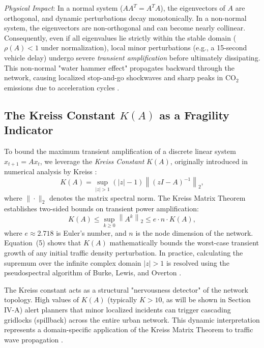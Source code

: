 \documentclass[lettersize,journal]{IEEEtran}
\begin{document}
\textit{Physical Impact}: In a normal system ($A A^T = A^T A$), the eigenvectors of $A$ are orthogonal, and dynamic perturbations decay monotonically. In a non-normal system, the eigenvectors are non-orthogonal and can become nearly collinear. Consequently, even if all eigenvalues lie strictly within the stable domain ($\rho(A) < 1$ under normalization), local minor perturbations (e.g., a 15-second vehicle delay) undergo severe \emph{transient amplification} before ultimately dissipating. This non-normal "water hammer effect" propagates backward through the network, causing localized stop-and-go shockwaves and sharp peaks in $\text{CO}_2$ emissions due to acceleration cycles \cite{Trefethen2005, Whitham2011, Kerner2009}.

\subsection{The Kreiss Constant $K(A)$ as a Fragility Indicator}
To bound the maximum transient amplification of a discrete linear system $x_{t+1} = A x_t$, we leverage the \emph{Kreiss Constant} $K(A)$, originally introduced in numerical analysis by Kreiss \cite{Kreiss1962}:
\begin{equation}
K(A) = \sup_{|z| > 1} (|z| - 1) \left\| (zI - A)^{-1} \right\|_2,
\end{equation}
where $\|\cdot\|_2$ denotes the matrix spectral norm. The Kreiss Matrix Theorem establishes two-sided bounds on transient power amplification:
\begin{equation}
K(A) \le \sup_{k \ge 0} \left\| A^k \right\|_2 \le e \cdot n \cdot K(A),
\end{equation}
where $e \approx 2.718$ is Euler's number, and $n$ is the node dimension of the network. Equation~(5) shows that $K(A)$ mathematically bounds the worst-case transient growth of any initial traffic density perturbation. In practice, calculating the supremum over the infinite complex domain $|z| > 1$ is resolved using the pseudospectral algorithm of Burke, Lewis, and Overton \cite{Burke2003}.

The Kreiss constant acts as a structural "nervousness detector" of the network topology. High values of $K(A)$ (typically $K > 10$, as will be shown in Section IV-A) alert planners that minor localized incidents can trigger cascading gridlocks (spillback) across the entire urban network. This dynamic interpretation represents a domain-specific application of the Kreiss Matrix Theorem to traffic wave propagation \cite{Trefethen2005}.
\end{document}
